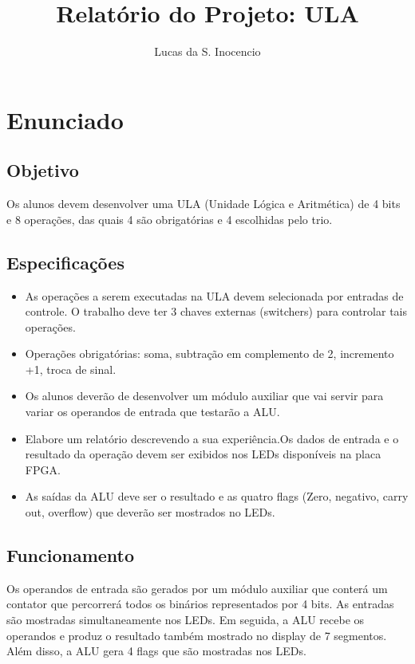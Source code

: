 \documentclass[12pt]{article}
\title{Relatório do Projeto: ULA}
\author{Lucas da S. Inocencio}
\begin{document}
\maketitle

\section{Enunciado}

\subsection*{Objetivo}

Os alunos devem desenvolver uma ULA (Unidade Lógica e Aritmética) de 4 bits e 8 operações, das quais 4 são obrigatórias e 4 escolhidas pelo trio.

\subsection*{Especificações}

\begin{itemize}
    \item As operações a serem executadas na ULA devem selecionada por entradas de controle. O
trabalho deve ter 3 chaves externas (switchers) para controlar tais operações.
    \item Operações obrigatórias: soma, subtração em complemento de 2, incremento +1, troca de
sinal.
    \item Os alunos deverão de desenvolver um módulo auxiliar que vai servir para variar os operandos
de entrada que testarão a ALU.
    \item Elabore um relatório descrevendo a sua experiência.Os dados de entrada e o resultado da operação devem ser exibidos nos LEDs disponíveis na
placa FPGA.
    \item As saídas da ALU deve ser o resultado e as quatro flags (Zero, negativo, carry out, overflow)
que deverão ser mostrados no LEDs.
\end{itemize}


\subsection*{Funcionamento}

Os operandos de entrada são gerados por um módulo auxiliar que conterá um contator que percorrerá todos os binários representados por 4 bits. As entradas são mostradas simultaneamente nos LEDs. Em seguida, a ALU recebe os operandos e produz o resultado também mostrado no display de 7 segmentos. Além disso, a ALU gera 4 flags que são mostradas nos LEDs.
\end{document}
